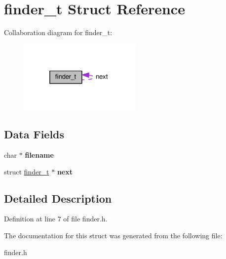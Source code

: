 \hypertarget{structfinder__t}{}\section{finder\+\_\+t Struct Reference}
\label{structfinder__t}


Collaboration diagram for finder\+\_\+t\+:\nopagebreak
\begin{figure}[H]
\begin{center}
\leavevmode
\includegraphics[width=169pt]{structfinder__t__coll__graph}
\end{center}
\end{figure}
\subsection*{Data Fields}
\begin{DoxyCompactItemize}
\item 
char $\ast$ {\bfseries filename}\hypertarget{structfinder__t_aeac90097f29f7529968697163cea5c18}{}\label{structfinder__t_aeac90097f29f7529968697163cea5c18}

\item 
struct \hyperlink{structfinder__t}{finder\+\_\+t} $\ast$ {\bfseries next}\hypertarget{structfinder__t_a7db9cac9324009990f14b7f84bf47d3c}{}\label{structfinder__t_a7db9cac9324009990f14b7f84bf47d3c}

\end{DoxyCompactItemize}


\subsection{Detailed Description}


Definition at line 7 of file finder.\+h.



The documentation for this struct was generated from the following file\+:\begin{DoxyCompactItemize}
\item 
finder.\+h\end{DoxyCompactItemize}
